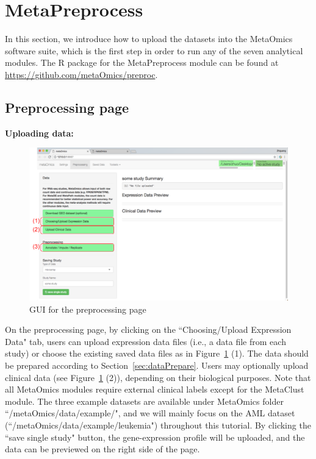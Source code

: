 

\section{MetaPreprocess}

In this section, we introduce how to upload the datasets into the MetaOmics software suite,
which is the first step in order to run any of the seven analytical modules.
The R package for the MetaPreprocess module can be found at \url{https://github.com/metaOmics/preproc}.

\subsection{Preprocessing page}
\label{sec:procedure}

\begin{steps}
\item \textbf{Uploading data:}

\begin{figure}[!htbp]
\begin{center}
\includegraphics[scale=0.53]{./figure/preprocessing/GUIpreprocessing}
\caption{GUI for the preprocessing page}
\label{fig:GUIpreprocessing}
\end{center}
\end{figure}

On the preprocessing page,
by clicking on the ``Choosing/Upload Expression Data" tab,
users can upload expression data files (i.e., a data file from each study) 
or choose the existing saved data files as in Figure~\ref{fig:GUIpreprocessing} {\color{red} (1)}.
The data should be prepared according to Section~\ref{sec:dataPrepare}.
Users may optionally upload clinical data (see Figure~\ref{fig:GUIpreprocessing} {\color{red} (2)}), 
depending on their biological purposes.
Note that all MetaOmics modules require external clinical labels except for the MetaClust module.
The three example datasets are available under MetaOmics folder ``/metaOmics/data/example/",
and we will mainly focus on the AML dataset (``/metaOmics/data/example/leukemia") throughout this tutorial.
By clicking the ``save single study" button, 
the gene-expression profile will be uploaded, 
and the data can be previewed on the right side of the page.



\end{steps}
